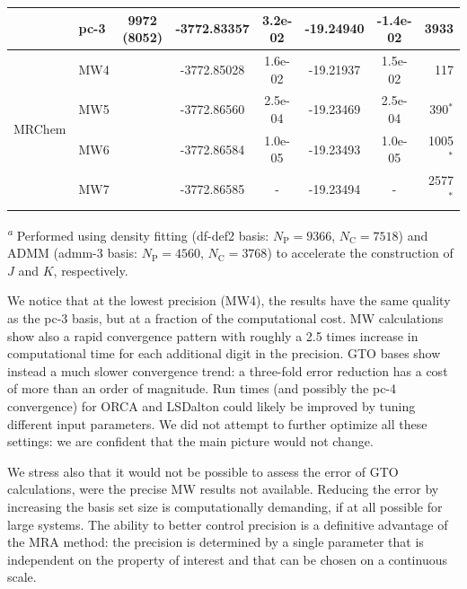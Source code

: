 \documentclass[journal=jctcce, manuscript=article]{achemso}
\begin{document}
\begin{table}[htb]
\begin{tabular}{llcccccr}
                      & pc-3&9972 (8052)&-3772.83357 &3.2e-02 &-19.24940 &-1.4e-02  &3933    \\
    \midrule                    
\multirow{4}{*}{MRChem} & MW4 &&-3772.85028 &1.6e-02 &-19.21937 &1.5e-02   &117     \\
                        & MW5 &&-3772.86560 &2.5e-04 &-19.23469 &2.5e-04   &390$^*$  \\
                        & MW6 &&-3772.86584 &1.0e-05 &-19.23493 &1.0e-05   &1005$^*$ \\
                        & MW7 &&-3772.86585 &-       &-19.23494 &-         &2577$^*$ \\
    \bottomrule
    \end{tabular}    
    

\textsuperscript{\emph{a}} Performed using density fitting (df-def2 basis: $N_{\mathrm{P}}=9366$, $N_{\mathrm{C}}=7518$) and ADMM (admm-3 basis: $N_{\mathrm{P}}=4560$, $N_{\mathrm{C}}=3768$) to accelerate the construction of $J$ and $K$, respectively.\cite{Kumar2018-yc}
\end{table}


We notice that at the lowest precision (MW4), the results have
the same quality as the pc-3 basis, but at a fraction of the computational
cost. \ac{MW} calculations show also a rapid convergence pattern with
roughly a 2.5 times increase in computational time for each
additional digit in the precision. \ac{GTO} bases show instead a much
slower convergence trend: a three-fold error reduction has a cost of
more than an order of magnitude. Run times (and possibly the pc-4 convergence) for ORCA\cite{Neese2022-ub}
and LSDalton\cite{Aidas2014-rp} could likely be improved by tuning
different input parameters. We did not attempt to further optimize all
these settings: we are confident that the main picture would not
change.

We stress also that it would not be possible to assess the error of
\ac{GTO} calculations, were the precise \ac{MW} results not available.
Reducing the error by increasing the basis set size is computationally
demanding, if at all possible for large systems.
The ability to better control precision is a definitive advantage of the \ac{MRA} method:
the precision is determined by a single parameter that is independent on the property of interest and that can be chosen on a continuous scale.
\end{document}
